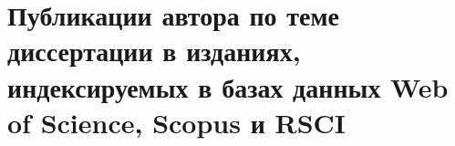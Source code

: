 \clearpage

\chapter*{
	Публикации автора по теме диссертации в изданиях, индексируемых в базах данных Web of Science, Scopus и RSCI
}
\vspace{-1em}
\hypersetup{urlcolor=blue}
